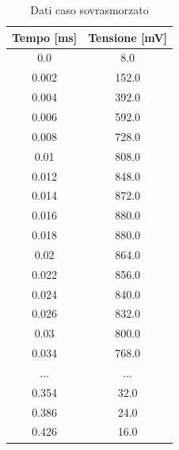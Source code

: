 \documentclass[letterpaper,12pt]{article}
\begin{document}
\begin{table}[htbp]
    \centering
    \caption{Dati caso sovrasmorzato}
    \begin{tabular}{cc}
        \toprule
        Tempo [ms] & Tensione [mV] \\
        \midrule
        0.0 & 8.0 \\
        0.002 & 152.0 \\
        0.004 & 392.0 \\
        0.006 & 592.0 \\
        0.008 & 728.0 \\
        0.01 & 808.0 \\
        0.012 & 848.0 \\
        0.014 & 872.0 \\
        0.016 & 880.0 \\
        0.018 & 880.0 \\
        0.02 & 864.0 \\
        0.022 & 856.0 \\
        0.024 & 840.0 \\
        0.026 & 832.0 \\
        0.03 & 800.0 \\
        0.034 & 768.0 \\
        ... & ...\\
        0.354 & 32.0 \\
        0.386 & 24.0 \\
        0.426 & 16.0 \\
        \bottomrule
    \end{tabular}
    \label{tab:dati_RLC_svsm}
\end{table}
\end{document}

